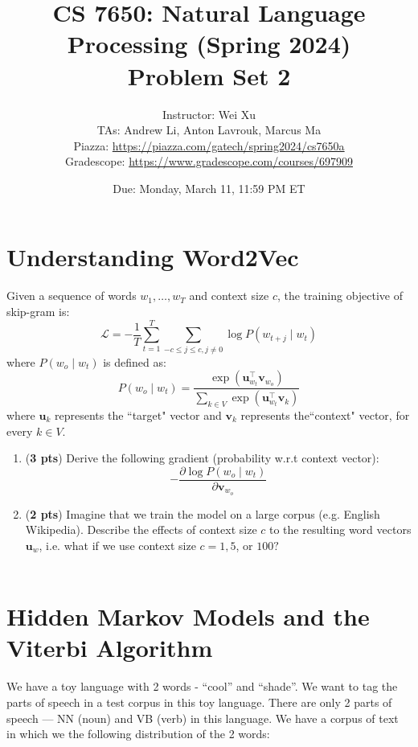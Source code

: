 \documentclass[11pt, letterpaper]{article}
\begin{document}
\title{CS 7650: Natural Language Processing (Spring 2024) \\ Problem Set 2}
\author{Instructor: Wei Xu \\ TAs: Andrew Li, Anton Lavrouk, Marcus Ma
\\Piazza: \url{https://piazza.com/gatech/spring2024/cs7650a}
\\Gradescope: \url{https://www.gradescope.com/courses/697909}}
\date{Due: Monday, March 11, 11:59 PM ET}
\maketitle

\section{Understanding Word2Vec}
Given a sequence of words $w_{1}, \ldots, w_{T}$ and context size $c$, the training objective of skip-gram is:
$$
\mathcal{L}=-\frac{1}{T} \sum_{t=1}^{T} \sum_{-c \leq j \leq c, j \neq 0} \log P\left(w_{t+j} \mid w_{t}\right)
$$
where $P\left(w_{o} \mid w_{t}\right)$ is defined as:
$$
P\left(w_{o} \mid w_{t}\right)=\frac{\exp \left(\mathbf{u}_{w_{t}}^{\top} \mathbf{v}_{w_{o}}\right)}{\sum_{k \in V} \exp \left(\mathbf{u}_{w_{t}}^{\top} \mathbf{v}_{k}\right)}
$$
where $\mathbf{u}_{k}$ represents the ``target" vector and $\mathbf{v}_{k}$ represents the``context" vector, for every $k \in V$.\\
\begin{enumerate}[label=(\alph*)]
\item (\textbf{3 pts}) Derive the following gradient (probability w.r.t context vector):
$$
-\frac{\partial \log P\left(w_{o} \mid w_{t}\right)}{\partial \mathbf{v}_{w_{o}}}
$$

\item (\textbf{2 pts}) Imagine that we train the model on a large corpus (e.g. English Wikipedia). Describe the effects of context size $c$ to the resulting word vectors $\mathbf{u}_{w}$, i.e. what if we use context size $c=1,5$, or $100 ?$\\\\

\end{enumerate}

\newpage

\section{Hidden Markov Models and the Viterbi Algorithm}
    We have a toy language with 2 words - “cool” and “shade”. We want to tag the parts of speech in a test corpus in this toy language. There are only 2 parts of speech — NN (noun) and VB (verb) in this language. We have a corpus of text in which we the following distribution of the 2 words:
    
\end{document}
